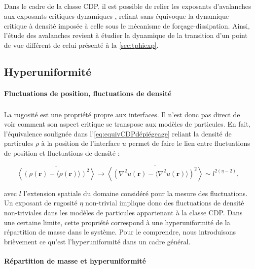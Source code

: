 \subparagraph{}Dans le cadre de la classe CDP, il est possible de relier les exposants d'avalanches aux exposants critiques dynamiques \cite{munoz_avalanche_1999, lubeck_universal_2004}, reliant sans équivoque la dynamique critique à densité imposée à celle sous le mécanisme de forçage-dissipation. Ainsi, l'étude des avalanches revient à étudier la dynamique de la transition d'un point de vue différent de celui présenté à la \autoref{sec:tphiexp}.

\subsection{Hyperuniformité}

\label{sec:introHU}

\paragraph{Fluctuations de position, fluctuations de densité}

\subparagraph{}La rugosité est une propriété propre aux interfaces. Il n'est donc pas direct de voir comment son aspect critique se transpose aux modèles de particules. En fait, l'équivalence soulignée dans l'\autoref{eq:equivCDPdépiégeage} reliant la densité de particules $\rho$ à la position de l'interface $u$ permet de faire le lien entre fluctuations de position et fluctuations de densité :

\begin{equation}
	\overline{\left\langle (\rho(\mathbf{r}) - \langle \rho(\mathbf{r}) \rangle)^2\right\rangle} \rightarrow \overline{\left\langle (\nabla^2 u(\mathbf{r}) - \langle \nabla^2 u(\mathbf{r}) \rangle)^2\right\rangle} \sim l^{2(\eta-2)},
	\label{eq:MappingHyperuni}
\end{equation}

\noindent avec $l$ l'extension spatiale du domaine considéré pour la mesure des fluctuations. Un exposant de rugosité $\eta$ non-trivial implique donc des fluctuations de densité non-triviales dans les modèles de particules appartenant à la classe CDP. Dans une certaine limite, cette propriété correspond à une hyperuniformité de la répartition de masse dans le système. Pour le comprendre, nous introduisons brièvement ce qu'est l'hyperuniformité dans un cadre général.

\paragraph{Répartition de masse et hyperuniformité}

